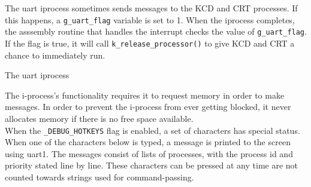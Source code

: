 \documentclass[12pt]{report}
\begin{document}
The uart iprocess sometimes sends messages to the KCD and CRT processes. If this happens, a {\tt g\_uart\_flag} variable is set to 1. When the iprocess completes, the asssembly routine that handles the interrupt checks the value of {\tt g\_uart\_flag}. If the flag is true, it will call {\tt k\_release\_processor()} to give KCD and CRT a chance to immediately run.\\

\begin{algorithm}
  \caption{The uart iprocess}
  \begin{algorithmic}[1]
				\State {}
			\EndIf
			\EndIf

				\EndIf
			\Else
			\EndIf

			\State {}
		\EndIf
    \EndProcedure
  \end{algorithmic}
\end{algorithm}

The i-process's functionality requires it to request memory in order to make messages. In order to prevent the i-process from ever getting blocked, it never allocates memory if there is no free space available.\\

When the {\tt \_DEBUG\_HOTKEYS} flag is enabled, a set of characters has special status. When one of the characters below is typed, a message is printed to the screen using uart1. The messages consist of lists of processes, with the process id and priority stated line by line. These characters can be pressed at any time are not counted towards strings used for command-passing.\\
\end{document}
